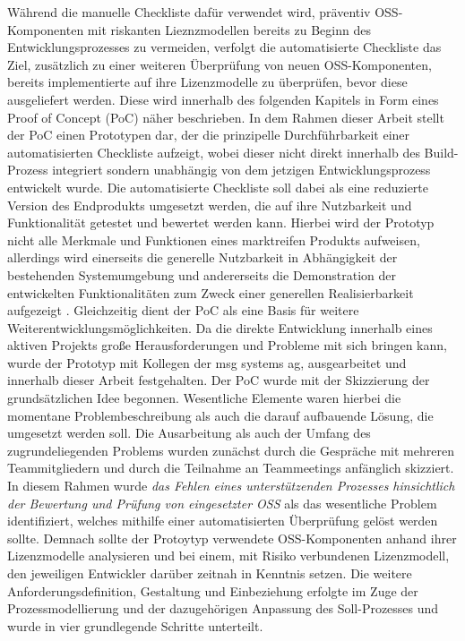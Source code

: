 Während die manuelle Checkliste dafür verwendet wird, präventiv OSS-Komponenten mit riskanten Lieznzmodellen bereits zu Beginn des Entwicklungsprozesses zu vermeiden, verfolgt die automatisierte Checkliste das Ziel, zusätzlich zu einer weiteren Überprüfung von neuen OSS-Komponenten, bereits implementierte auf ihre Lizenzmodelle zu überprüfen, bevor diese ausgeliefert werden. Diese wird innerhalb des folgenden Kapitels in Form eines Proof of Concept (PoC) näher beschrieben. In dem Rahmen dieser Arbeit stellt der PoC einen Prototypen dar, der die prinzipelle Durchführbarkeit einer automatisierten Checkliste aufzeigt, wobei dieser nicht direkt innerhalb des Build-Prozess integriert sondern unabhängig von dem jetzigen Entwicklungsprozess entwickelt wurde. Die automatisierte Checkliste soll dabei als eine reduzierte Version des Endprodukts umgesetzt werden, die auf ihre Nutzbarkeit und Funktionalität getestet und bewertet werden kann. Hierbei wird der Prototyp nicht alle Merkmale und Funktionen eines marktreifen Produkts aufweisen, allerdings wird einerseits die generelle Nutzbarkeit in Abhängigkeit der bestehenden Systemumgebung und andererseits die Demonstration der entwickelten Funktionalitäten zum Zweck einer generellen Realisierbarkeit aufgezeigt \cite{dreher_prototyping_2018}. Gleichzeitig dient der PoC als eine Basis für weitere Weiterentwicklungsmöglichkeiten. Da die direkte Entwicklung innerhalb eines aktiven Projekts große Herausforderungen und Probleme mit sich bringen kann, wurde der Prototyp mit Kollegen der msg systems ag, ausgearbeitet und innerhalb dieser Arbeit festgehalten. Der PoC wurde mit der Skizzierung der grundsätzlichen Idee begonnen. Wesentliche Elemente waren hierbei die momentane Problembeschreibung als auch die darauf aufbauende Lösung, die umgesetzt werden soll. Die Ausarbeitung als auch der Umfang des zugrundeliegenden Problems wurden zunächst durch die Gespräche mit mehreren Teammitgliedern und durch die Teilnahme an Teammeetings anfänglich skizziert. In diesem Rahmen wurde \textit{das Fehlen eines unterstützenden Prozesses hinsichtlich der Bewertung und Prüfung von eingesetzter OSS} als das wesentliche Problem identifiziert, welches mithilfe einer automatisierten Überprüfung gelöst werden sollte. Demnach sollte der Protoytyp verwendete OSS-Komponenten anhand ihrer Lizenzmodelle analysieren und bei einem, mit Risiko verbundenen Lizenzmodell, den jeweiligen Entwickler darüber zeitnah in Kenntnis setzen. Die weitere Anforderungsdefinition, Gestaltung und Einbeziehung erfolgte im Zuge der Prozessmodellierung und der dazugehörigen Anpassung des Soll-Prozesses und wurde in vier grundlegende Schritte unterteilt.



